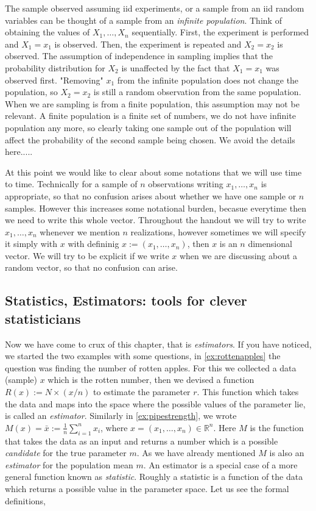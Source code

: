 \documentclass[ 11pt,%
				a4paper,%
				twoside,%
				headinclude,%
				footinclude = true,%
				cleardoublepage = empty,%
				reqno]{scrbook}
\begin{document}
The sample observed assuming iid experiments, or a sample from an iid random variables can be thought of a sample from an \emph{infinite population}. Think of obtaining the values of $X_{1}, \ldots, X_{n}$ sequentially. First, the experiment is performed and $X_{1}=x_{1}$ is observed. Then, the experiment is repeated and $X_{2}=x_{2}$ is observed. The assumption of independence in sampling implies that the probability distribution for $X_{2}$ is unaffected by the fact that $X_{1}=x_{1}$ was observed first. "Removing" $x_{1}$ from the infinite population does not change the population, so $X_{2}=x_{2}$ is still a random observation from the same population. When we are sampling is from a finite population, this assumption may not be relevant. A finite population is a finite set of numbers, we do not have infinite population any more, so clearly taking one sample out of the population will affect the probability of the second sample being chosen. We avoid the details here..... 


\begin{notation}
  At this point we would like to clear about some notations that we will use time to time. Technically for a sample of $n$ observations writing $x_1, \ldots, x_n$ is appropriate, so that no confusion arises about whether we have one sample or $n$ samples. However this increases some notational burden, becasue everytime then we need to write this whole vector. Throughout the handout we will try to write $x_1, \ldots, x_n$ whenever we mention $n$ realizations, however sometimes we will specify it simply with $x$ with defininig $x := (x_1, \ldots, x_n)$, then $x$ is an $n$ dimensional vector. We will try to be explicit if we write $x$ when we are discussing about a random vector, so that no confusion can arise.
\end{notation}

\subsection{Statistics, Estimators: tools for clever statisticians}

Now we have come to crux of this chapter, that is \emph{estimators}. If you have noticed, we started the two examples with some questions, in \cref{ex:rottenapples} the question was finding the number of rotten apples. For this we collected a data (sample) $x$ which is the rotten number, then we devised a function $R(x):=N \times(x / n)$ to estimate the parameter $r$. This function which takes the data and maps into the space where the possible values of the parameter lie, is called an \emph{estimator}. Similarly in \cref{ex:pipestrength}, we wrote $M(x)=\bar{x}:=\frac{1}{n} \sum_{i=1}^{n} x_{i}$, where $x=\left(x_{1}, \ldots, x_{n}\right) \in \mathbb{R}^{n}$. Here $M$ is the function that takes the data as an input and returns a number which is a possible \emph{candidate} for the true parameter $m$. As we have already mentioned $M$ is also an \emph{estimator} for the population mean $m$. An estimator is a special case of a more general function known as \emph{statistic}. Roughly a statistic is a function of the data which returns a possible value in the parameter space. Let us see the formal definitions,
\end{document}
